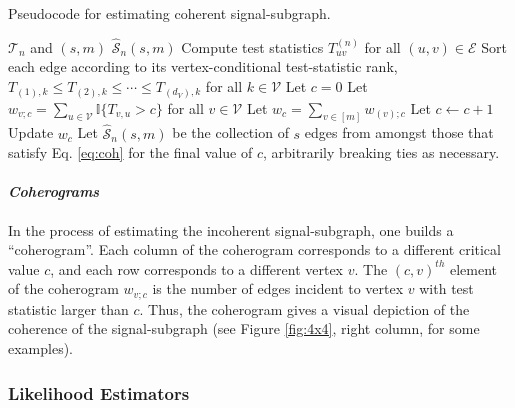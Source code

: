 \documentclass[10pt,journal,cspaper,compsoc]{IEEEtran}
\newcommand{\II}{\mathbb{I}}           %
\providecommand{\mc}[1]{\mathcal{#1}}
\providecommand{\mhc}[1]{\widehat{\mathcal{#1}}}
\begin{document}
\begin{algorithm}
\caption{Pseudocode for estimating coherent signal-subgraph.}
\label{alg:coh}
\begin{algorithmic}[1]
\REQUIRE $\mc{T}_n$ and $(s,m)$
\ENSURE $\mhc{S}_n(s,m)$
\STATE Compute test statistics $T_{uv}^{(n)}$ for all $(u,v) \in \mc{E}$
\STATE Sort each edge according to its vertex-conditional test-statistic rank, $T_{(1),k} \leq T_{(2),k} \leq \cdots \leq T_{(d_V),k}$ for all $k \in \mc{V}$
\STATE Let $c=0$
\STATE Let $w_{v;c}=\sum_{u \in \mc{V}} \II\{T_{v,u}>c\}$ for all $v \in \mc{V}$ 
\STATE Let $w_c=\sum_{v \in [m]} w_{(v);c}$
\STATE Let $c \leftarrow c+ 1$
\STATE Update $w_c$ 
\ENDWHILE
\STATE Let $\mhc{S}_n(s,m)$ be the collection of $s$ edges from amongst those that satisfy Eq. \eqref{eq:coh} for the final value of $c$, arbitrarily breaking ties as necessary.
\end{algorithmic}
\end{algorithm}

\paragraph{\emph{Coherograms}}

In the process of estimating the incoherent signal-subgraph, one builds a ``coherogram''.  Each column of the coherogram corresponds to a different critical value $c$, and each row corresponds to a different vertex $v$.  The $(c,v)^{th}$ element of the coherogram $w_{v;c}$ is the number of edges incident to vertex $v$ with test statistic larger than $c$.  Thus, the coherogram gives a visual depiction of the coherence of the signal-subgraph (see Figure \ref{fig:4x4}, right column, for some examples).


\subsubsection{Likelihood Estimators} %
\label{sub:likelihood}
\end{document}
